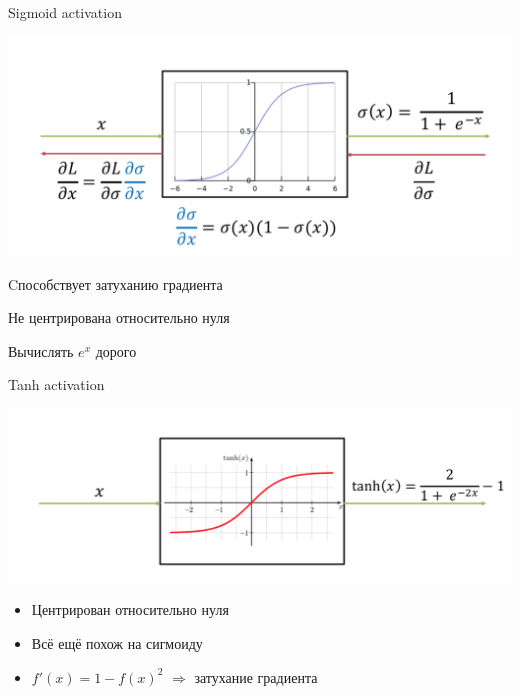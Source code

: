 \documentclass[notes,12pt, aspectratio=169]{beamer}
\begin{document}
\begin{frame}{Sigmoid activation}
\begin{center}
\includegraphics[width=.65\linewidth]{sigmoid_activation_2.png}
\end{center}

\begin{itemize}
{\color{red} 
\item Cпособствует затуханию градиента

\item Не центрирована относительно нуля

\item Вычислять $e^x$ дорого
}
\end{itemize}
\end{frame}


\begin{frame}{Tanh activation}
\begin{center}
\includegraphics[width=.7\linewidth]{tanh_activation.png}
\end{center}

\begin{itemize}
\item  {\color{green}  Центрирован относительно нуля }

\item  {\color{red}  Всё ещё похож на сигмоиду }

\item $f'(x) = 1 - f(x)^2$  $\Rightarrow$ затухание градиента

\end{itemize}
\end{frame}
\end{document}
